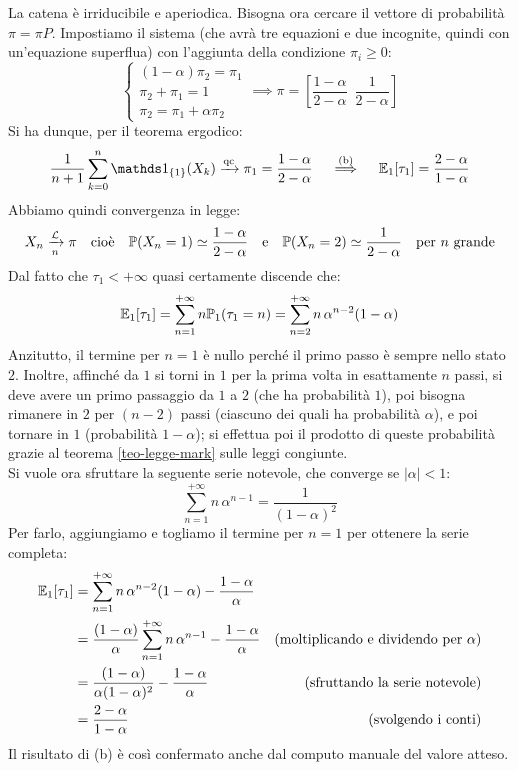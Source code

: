 \begin{ese}
\begin{figure}[H]
	\end{figure}
	La catena è irriducibile e aperiodica.
	Bisogna ora cercare il vettore di probabilità $\pi = \pi P$.
	Impostiamo il sistema (che avrà tre equazioni e due incognite, quindi con un'equazione superflua) con l'aggiunta della condizione $\pi_i \ge 0$:
	$$ \begin{cases}
	(1-\alpha) \pi_2 = \pi_1 \\
	\pi_2 + \pi_1 = 1 \\
	\pi_2 = \pi_1 + \alpha \pi_2
	\end{cases}
	\implies
	\pi = \left[ \frac{1-\alpha}{2-\alpha} \enspace \frac{1}{2-\alpha} \right]$$
	Si ha dunque, per il teorema ergodico:
	$$ \frac{1}{n+1} \sum_{k=0}^n \Ind_{\{1\}}(X_k) \xrightarrow{\text{qc}} \pi_1 = \frac{1-\alpha}{2-\alpha}
	\quad \stackrel{\text{(b)}}{\implies} \quad \EE_1[\tau_1] = \frac{2-\alpha}{1-\alpha}$$
	Abbiamo quindi convergenza in legge:
	$$X_n \xrightarrow[n]{\mathcal L} \pi \quad \text{cioè} \quad \mathbb P(X_n = 1) \simeq \frac{1-\alpha}{2-\alpha} \quad \text e \quad
	\mathbb P(X_n = 2) \simeq \frac{1}{2-\alpha} \quad \text{per $n$ grande}$$
	Dal fatto che $\tau_1 < +\infty$ quasi certamente discende che:
	$$ \mathbb E_1[\tau_1] = \sum_{n=1}^{+\infty} n \mathbb P_1(\tau_1 = n)
	= \sum_{n=2}^{+\infty} n \, \alpha^{n-2} (1-\alpha) $$
	Anzitutto, il termine per $n=1$ è nullo perché il primo passo è sempre nello stato $2$.
	Inoltre, affinché da $1$ si torni in $1$ per la prima volta in esattamente $n$ passi,
	si deve avere un primo passaggio da $1$ a $2$ (che ha probabilità $1$), poi
	bisogna rimanere in $2$ per $(n-2)$ passi (ciascuno dei quali ha probabilità $\alpha$),
	e poi tornare in $1$ (probabilità $1-\alpha$);
	si effettua poi il prodotto di queste probabilità grazie al teorema \ref{teo-legge-mark} sulle leggi congiunte. \\
	Si vuole ora sfruttare la seguente serie notevole, che converge se $|\alpha| < 1$:
	$$\sum_{n=1}^{+\infty} n \, \alpha^{n-1} = \frac{1}{(1-\alpha)^2}$$
	Per farlo, aggiungiamo e togliamo il termine per $n=1$ per ottenere la serie completa:
	\begin{align*}
		\mathbb E_1[\tau_1] &= \sum_{n=1}^{+\infty} n \, \alpha^{n-2} (1-\alpha) - \frac{1-\alpha}{\alpha} \\
		&= \frac{(1-\alpha)}{\alpha} \sum_{n=1}^{+\infty} n \, \alpha^{n-1} - \frac{1-\alpha}{\alpha}
		&\text{(moltiplicando e dividendo per $\alpha$)} \\
		&= \frac{(1-\alpha)}{\alpha(1-\alpha)^2} - \frac{1-\alpha}{\alpha}
		&\text{(sfruttando la serie notevole)} \\
		&= \frac{2-\alpha}{1-\alpha} &\text{(svolgendo i conti)}
	\end{align*}
	Il risultato di (b) è così confermato anche dal computo manuale del valore atteso.
\end{ese}
